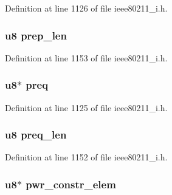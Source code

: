 Definition at line 1126 of file ieee80211\-\_\-i.\-h.

\hypertarget{structieee802__11__elems_a1a08ce2841b5af833d18884e6e2e1b88}{
\subsubsection[{prep\-\_\-len}]{\setlength{\rightskip}{0pt plus 5cm}u8 prep\-\_\-len}}\label{structieee802__11__elems_a1a08ce2841b5af833d18884e6e2e1b88}


Definition at line 1153 of file ieee80211\-\_\-i.\-h.

\hypertarget{structieee802__11__elems_a0e21b67c3354dad309120d348eac83ed}{
\subsubsection[{preq}]{\setlength{\rightskip}{0pt plus 5cm}u8$\ast$ preq}}\label{structieee802__11__elems_a0e21b67c3354dad309120d348eac83ed}


Definition at line 1125 of file ieee80211\-\_\-i.\-h.

\hypertarget{structieee802__11__elems_a5eac1db084f68b936ee32adf0e8e6b0d}{
\subsubsection[{preq\-\_\-len}]{\setlength{\rightskip}{0pt plus 5cm}u8 preq\-\_\-len}}\label{structieee802__11__elems_a5eac1db084f68b936ee32adf0e8e6b0d}


Definition at line 1152 of file ieee80211\-\_\-i.\-h.

\hypertarget{structieee802__11__elems_a19eaf1ea27d26716ab4ff793995dd946}{
\subsubsection[{pwr\-\_\-constr\-\_\-elem}]{\setlength{\rightskip}{0pt plus 5cm}u8$\ast$ pwr\-\_\-constr\-\_\-elem}}\label{structieee802__11__elems_a19eaf1ea27d26716ab4ff793995dd946}


